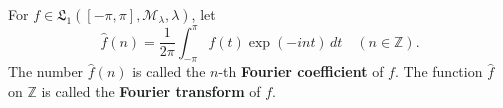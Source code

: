 For $f \in \mathfrak{L}_1([-\pi, \pi], \mathcal{M}_{\lambda}, \lambda)$, let
$$\hat{f}(n) = \frac{1}{2\pi} \int_{-\pi}^{\pi} f(t) \exp(-int) \, dt \quad (n \in \mathbb{Z}).$$
The number $\hat{f}(n)$ is called the $n$-th \textbf{Fourier coefficient} of $f$. The function $\hat{f}$ on $\mathbb{Z}$ is called the \textbf{Fourier transform} of $f$.
